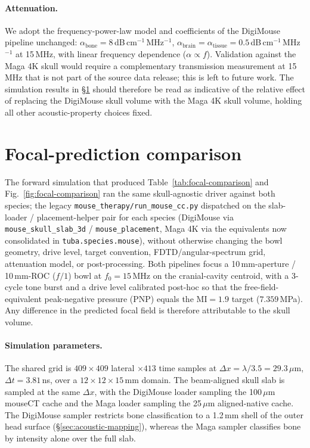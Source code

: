 \documentclass{compactarticle}
\begin{document}
\paragraph{Attenuation.} We adopt the frequency-power-law model and
coefficients of the DigiMouse pipeline unchanged:
$\alpha_{\mathrm{bone}} = 8$\,dB\,cm$^{-1}$\,MHz$^{-1}$,
$\alpha_{\mathrm{brain}} = \alpha_{\mathrm{tissue}} = 0.5$\,dB\,cm$^{-1}$\,MHz$^{-1}$
at 15\,MHz, with linear frequency dependence ($\alpha \propto f$).
Validation against the Maga 4K skull would require a complementary
transmission measurement at 15\,MHz that is not part of the source data
release; this is left to future work. The simulation results in
\S\ref{sec:comparison} should therefore be read as indicative of the
relative effect of replacing the DigiMouse skull volume with the Maga
4K skull volume, holding all other acoustic-property choices fixed.

\section{Focal-prediction comparison}
\label{sec:comparison}

The forward simulation that produced
Table~\ref{tab:focal-comparison} and Fig.~\ref{fig:focal-comparison}
ran the same skull-agnostic driver against both species; the legacy
\texttt{mouse\_therapy/run\_mouse\_cc.py} dispatched on the slab-loader
/ placement-helper pair for each species (DigiMouse via
\texttt{mouse\_skull\_slab\_3d} / \texttt{mouse\_placement}, Maga 4K
via the equivalents now consolidated in \texttt{tuba.species.mouse}),
without otherwise changing the bowl geometry, drive level, target
convention, FDTD/angular-spectrum grid, attenuation model, or
post-processing. Both pipelines focus a 10\,mm-aperture / 10\,mm-ROC
($f/1$) bowl at $f_0=15$\,MHz on the cranial-cavity centroid, with a
3-cycle tone burst and a drive level calibrated post-hoc so that the
free-field-equivalent peak-negative pressure (PNP) equals the
$\mathrm{MI}=1.9$ target ($7.359$\,MPa). Any difference in the
predicted focal field is therefore attributable to the skull volume.

\paragraph{Simulation parameters.} The shared grid is
$409\times 409$ lateral $\times 413$ time samples at
$\Delta x = \lambda/3.5 = 29.3$\,$\mu$m,
$\Delta t = 3.81$\,ns, over a $12\times 12\times 15$\,mm domain. The
beam-aligned skull slab is sampled at the same $\Delta x$, with the
DigiMouse loader sampling the 100\,$\mu$m mouseCT cache and the Maga
loader sampling the 25\,$\mu$m aligned-native cache. The DigiMouse
sampler restricts bone classification to a 1.2\,mm shell of the outer
head surface (\S\ref{sec:acoustic-mapping}), whereas the Maga sampler
classifies bone by intensity alone over the full slab.
\end{document}
